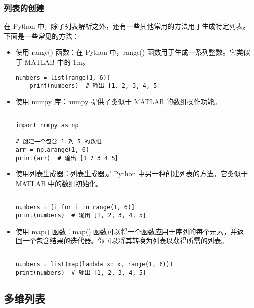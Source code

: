\documentclass{article}
\begin{document}
\subsubsection{列表的创建}

    

   在 Python 中，除了列表解析之外，还有一些其他常用的方法用于生成特定列表。下面是一些常见的方法：
   \begin{itemize}
\item 使用 range() 函数：在 Python 中，range() 函数用于生成一系列整数。它类似于 MATLAB 中的 1:n。
\begin{lstlisting}[caption={示例Python代码}]
    numbers = list(range(1, 6))
    print(numbers)  # 输出 [1, 2, 3, 4, 5]
\end{lstlisting}
\item 使用 numpy 库：numpy 提供了类似于 MATLAB 的数组操作功能。
\begin{lstlisting}[caption={示例Python代码}]

import numpy as np

# 创建一个包含 1 到 5 的数组
arr = np.arange(1, 6)
print(arr)  # 输出 [1 2 3 4 5]
\end{lstlisting}
\item 使用列表生成器：列表生成器是 Python 中另一种创建列表的方法。它类似于 MATLAB 中的数组初始化。
\begin{lstlisting}[caption={示例Python代码}]

numbers = [i for i in range(1, 6)]
print(numbers)  # 输出 [1, 2, 3, 4, 5]
\end{lstlisting}
\item 使用 map() 函数：map() 函数可以将一个函数应用于序列的每个元素，并返回一个包含结果的迭代器。你可以将其转换为列表以获得所需的列表。
\begin{lstlisting}[caption={示例Python代码}]

numbers = list(map(lambda x: x, range(1, 6)))
print(numbers)  # 输出 [1, 2, 3, 4, 5]
\end{lstlisting}

\end{itemize}
\subsection{多维列表}
\end{document}
